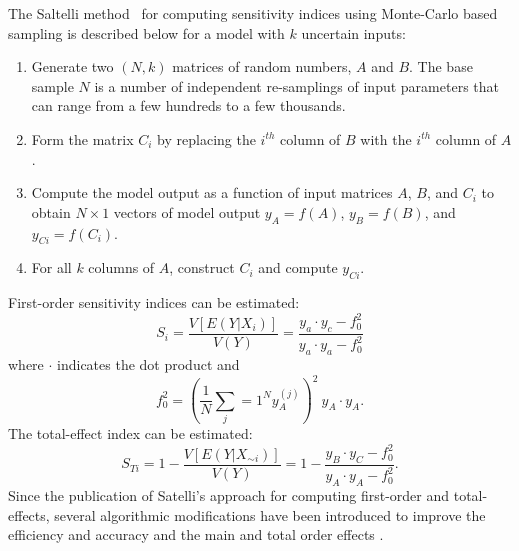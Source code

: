 The Saltelli method~\cite{saltelliGSA} for computing sensitivity indices using Monte-Carlo based sampling is described below for a model with $k$ uncertain inputs:
\begin{enumerate}
    \item Generate two $(N,k)$ matrices of random numbers, $A$ and $B$. The base sample $N$ is a number of independent re-samplings of input parameters that can range from a few hundreds to a few thousands. 
    \item Form the matrix $C_i$ by replacing the $i^{th}$ column of $B$ with the $i^{th}$ column of $A$.
    \item Compute the model output as a function of input matrices $A$, $B$, and $C_i$ to obtain $N\times 1$ vectors of model output $y_A=f(A)$, $y_B=f(B)$, and $y_{Ci}=f(C_i)$. 
    \item For all $k$ columns of $A$, construct $C_i$ and compute $y_{Ci}$.
\end{enumerate}
First-order sensitivity indices can be estimated:
\begin{equation}\label{eq:saltelli-si}
    S_i = \frac{V[E(Y|X_i)]}{V(Y)} = \frac{y_a \cdot y_c - f_0^2}{y_a \cdot y_a - f_0^2}
\end{equation} where $\cdot$ indicates the dot product and
\begin{equation}\label{eq:f0}
    f_0^2 = \left( \frac{1}{N} \sum_j=1^N y_A^{(j)} \right)^2 \ y_A \cdot y_A .
\end{equation}
The total-effect index can be estimated:
\begin{equation}
    S_{Ti} = 1 - \frac{V[E(Y|X_{\sim i})]}{V(Y)} = 1 - \frac{y_B \cdot y_C - f_0^2}{y_A \cdot y_A - f_0^2}.
\end{equation}
Since the publication of Satelli's approach for computing first-order and total- effects, several algorithmic modifications have been introduced to improve the efficiency and accuracy and the main and total order effects \cite{saltelli2002, MCMC-paper}.

